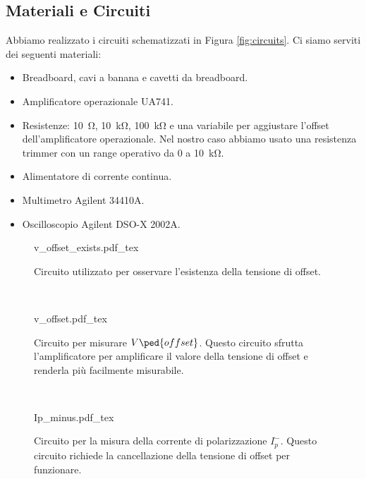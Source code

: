 \subsection{Materiali e Circuiti}

Abbiamo realizzato i circuiti schematizzati in Figura \ref{fig:circuits}.
Ci siamo serviti dei seguenti materiali:

\begin{itemize}
    \item{Breadboard, cavi a banana e cavetti da breadboard.}
    \item{Amplificatore operazionale UA741.}
    \item{Resistenze: \SI{10}{\ohm}, \SI{10}{\kilo\ohm}, \SI{100}{\kilo\ohm}
        e una variabile per aggiustare l'offset dell'amplificatore operazionale.
        Nel nostro caso abbiamo usato una resistenza trimmer con un range operativo da 0
        a \SI{10}{\kilo\ohm}.}
    \item{Alimentatore di corrente continua.}
    \item{Multimetro Agilent 34410A.}
    \item{Oscilloscopio Agilent DSO-X 2002A.}
\end{itemize}

\begin{figure*}[b]
        \centering
        \begin{subfigure}[b]{0.35\textwidth}
            \def\svgwidth{\columnwidth}
            {v_offset_exists.pdf_tex}
            \caption{Circuito utilizzato per osservare l'esistenza della tensione di offset.}
            \label{fig:v_off_exists}
        \end{subfigure}
        ~
        \begin{subfigure}[b]{0.48\textwidth}
            \def\svgwidth{\columnwidth}
            {v_offset.pdf_tex}
            \caption{Circuito per misurare $V\ped{offset}$. Questo circuito sfrutta l'amplificatore
                per amplificare il valore della tensione di offset e renderla più facilmente misurabile.}
            \label{fig:v_off_circ}
        \end{subfigure}
        ~
        \begin{subfigure}[b]{0.48\textwidth}
            \def\svgwidth{\columnwidth}
            {Ip_minus.pdf_tex}
            \caption{Circuito per la misura della corrente di polarizzazione $I_p^-$. Questo circuito
                richiede la cancellazione della tensione di offset per funzionare.}
            \label{fig:ip_minus_circ}
        \end{subfigure}
        \caption{Circuiti costruiti durante l'esperienza}
        \label{fig:circuits}
\end{figure*}
